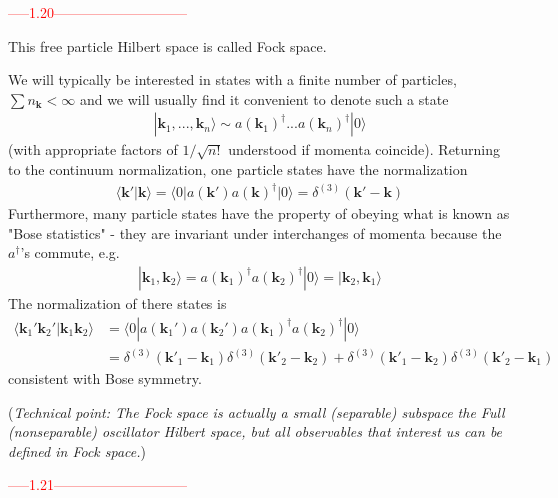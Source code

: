 \documentclass{article}
\begin{document}
\textcolor{red}{-----1.20-----------------------------}
\newline

This free particle Hilbert space is called Fock space.

We will typically be interested in states with a finite number of particles, $\sum n_\mathbf{k}<\infty$ and we will usually find it convenient to denote such a state
\begin{align}
|\mathbf{k}_1,...,\mathbf{k}_n\rangle\sim a(\mathbf{k}_1)^\dagger ...  a(\mathbf{k}_n)^\dagger|0\rangle
\end{align}
(with appropriate factors of $1/\sqrt{n!}$ understood if momenta coincide). Returning to the continuum normalization, one particle states have the normalization
\begin{align}
\langle\mathbf{k}'|\mathbf{k}\rangle
=\langle0|a(\mathbf{k}')a(\mathbf{k})^\dagger|0\rangle=\delta^{(3)}(\mathbf{k}'-\mathbf{k})
\end{align}
Furthermore, many particle states have the property of obeying what is known as "Bose statistics" - they are invariant under interchanges of momenta because the $a^\dagger$'s commute, e.g.
\begin{align}
|\mathbf{k}_1,\mathbf{k}_2\rangle=a(\mathbf{k}_1)^\dagger a(\mathbf{k}_2)^\dagger|0\rangle=|\mathbf{k}_2,\mathbf{k}_1\rangle
\end{align} 
The normalization of there states is
\begin{align}
\langle\mathbf{k}_1'\mathbf{k}_2'|\mathbf{k}_1\mathbf{k}_2\rangle
&=\langle0|a(\mathbf{k}_1')a(\mathbf{k}_2')a(\mathbf{k}_1)^\dagger a(\mathbf{k}_2)^\dagger|0\rangle\\
&=\delta^{(3)}(\mathbf{k}'_1-\mathbf{k}_1)\delta^{(3)}(\mathbf{k}'_2-\mathbf{k}_2)
+\delta^{(3)}(\mathbf{k}'_1-\mathbf{k}_2)\delta^{(3)}(\mathbf{k}'_2-\mathbf{k}_1)
\end{align}
consistent with Bose symmetry.

({\it Technical point: The Fock space is actually a small (separable) subspace the Full (nonseparable) oscillator Hilbert space, but all observables that interest us can be defined in Fock space.})

\textcolor{red}{-----1.21-----------------------------}
\newline
\end{document}
